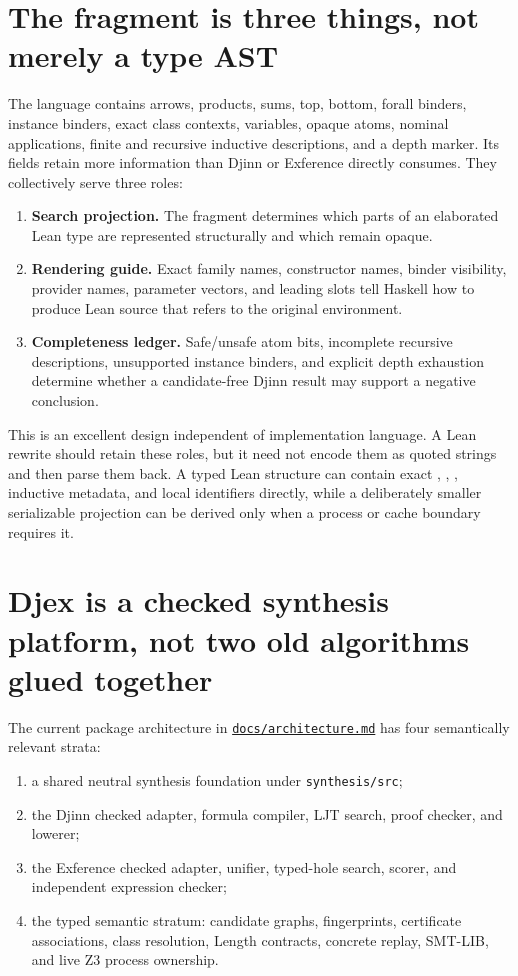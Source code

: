 \documentclass[10pt,letterpaper,oneside]{report}
\newcommand{\code}[1]{\texttt{\detokenize{#1}}}
\newcommand{\filepath}[1]{\nolinkurl{#1}}
\newcommand{\term}[1]{\textbf{#1}}
\def\DjexBase{https://github.com/VladimirReshetnikov/Djex/blob/43ec4f70b7540bbb76cb1bb72d9e5c4329cafe7f/}
\newcommand{\dpath}[1]{\href{\DjexBase#1}{\nolinkurl{#1}}}
\begin{document}
\section{The fragment is three things, not merely a type AST}

The \code{Frag} language contains arrows, products, sums, top, bottom, forall binders, instance binders, exact class contexts, variables, opaque atoms, nominal applications, finite and recursive inductive descriptions, and a depth marker. Its fields retain more information than Djinn or Exference directly consumes. They collectively serve three roles:

\begin{enumerate}
  \item \term{Search projection.} The fragment determines which parts of an elaborated Lean type are represented structurally and which remain opaque.
  \item \term{Rendering guide.} Exact family names, constructor names, binder visibility, provider names, parameter vectors, and leading slots tell Haskell how to produce Lean source that refers to the original environment.
  \item \term{Completeness ledger.} Safe/unsafe atom bits, incomplete recursive descriptions, unsupported instance binders, and explicit depth exhaustion determine whether a candidate-free Djinn result may support a negative conclusion.
\end{enumerate}

This is an excellent design independent of implementation language. A Lean rewrite should retain these roles, but it need not encode them as quoted strings and then parse them back. A typed Lean structure can contain exact \code{Name}, \code{Level}, \code{BinderInfo}, inductive metadata, and local identifiers directly, while a deliberately smaller serializable projection can be derived only when a process or cache boundary requires it.

\section{Djex is a checked synthesis platform, not two old algorithms glued together}

The current package architecture in \dpath{docs/architecture.md} has four semantically relevant strata:

\begin{enumerate}
  \item a shared neutral synthesis foundation under \filepath{synthesis/src};
  \item the Djinn checked adapter, formula compiler, LJT search, proof checker, and lowerer;
  \item the Exference checked adapter, unifier, typed-hole search, scorer, and independent expression checker;
  \item the typed semantic stratum: candidate graphs, fingerprints, certificate associations, class resolution, Length contracts, concrete replay, SMT-LIB, and live Z3 process ownership.
\end{enumerate}
\end{document}
